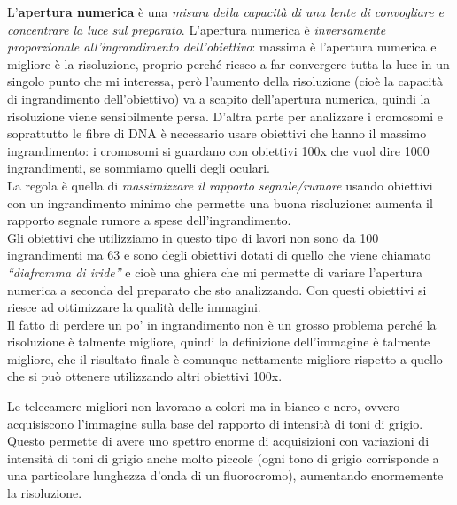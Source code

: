 \documentclass[11pt]{book}
\begin{document}
L’\textbf{apertura numerica} è una \emph{misura della capacità di una lente di convogliare e concentrare la luce sul preparato}. L’apertura numerica è \emph{inversamente proporzionale all’ingrandimento dell’obiettivo}: massima è l’apertura numerica e migliore è la risoluzione, proprio perché riesco a far convergere tutta la luce in un singolo punto che mi interessa, però l’aumento della risoluzione (cioè la capacità di ingrandimento dell’obiettivo) va a scapito dell’apertura numerica, quindi la risoluzione viene sensibilmente persa. D’altra parte per analizzare i cromosomi e soprattutto le fibre di DNA è necessario usare obiettivi che hanno il massimo ingrandimento: i cromosomi si guardano con obiettivi 100x che vuol dire 1000 ingrandimenti, se sommiamo quelli degli oculari.\\
La regola è quella di \emph{massimizzare il rapporto segnale/rumore} usando obiettivi con un ingrandimento minimo che permette una buona risoluzione: aumenta il rapporto segnale rumore a spese dell’ingrandimento.\\
Gli obiettivi che utilizziamo in questo tipo di lavori non sono da 100 ingrandimenti ma 63 e sono degli obiettivi dotati di quello che viene chiamato \emph{``diaframma di iride''} e cioè una ghiera che mi permette di variare l’apertura numerica a seconda del preparato che sto analizzando.
Con questi obiettivi si riesce ad ottimizzare la qualità delle immagini.\\
Il fatto di perdere un po’ in ingrandimento non è un grosso problema perché la risoluzione è talmente migliore, quindi la definizione dell’immagine è talmente migliore, che il risultato finale è comunque nettamente migliore rispetto a quello che si può ottenere utilizzando altri obiettivi 100x.

Le telecamere migliori non lavorano a colori ma in bianco e nero, ovvero acquisiscono l’immagine sulla base del rapporto di intensità di toni di grigio. Questo permette di avere uno spettro enorme di acquisizioni con variazioni di intensità di toni di grigio anche molto piccole (ogni tono di grigio corrisponde a una particolare lunghezza d'onda di un fluorocromo), aumentando enormemente la risoluzione.
\end{document}
